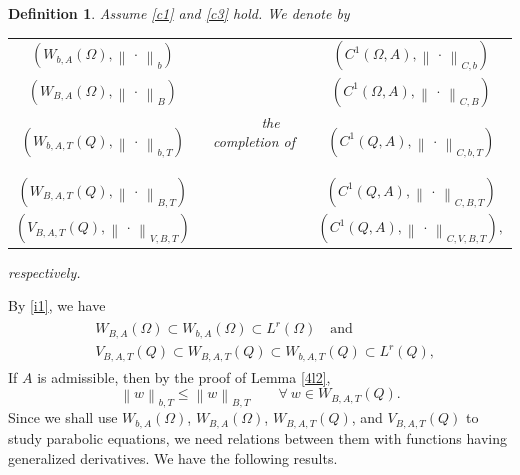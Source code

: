 \documentclass[11pt, a4paper]{article}
\newtheorem{definition}{Definition}%
\numberwithin{equation}{section}
\newcommand{\norm}[1]{\left\lVert #1\right\rVert}
\begin{document}
\begin{definition}
  Assume \eqref{c1} and \eqref{c3} hold. We denote by
  \begin{center}
    \begin{tabular}[ht]{ccc}
      $\left(W_{b,A}(\Omega),\norm{\,\cdot\,}_{b} \right)$ &  &
                                                              $\left(C^{1}(\Omega,A),\norm{\,\cdot\,}_{C,b} \right)$\\
      $\left(W_{B,A}(\Omega),\norm{\,\cdot\,}_{B} \right)$ &&
                                                              $\left(C^{1}(\Omega,A),\norm{\,\cdot\,}_{C,B} \right)$\\
      $\left(W_{b,A,T}(Q),\norm{\,\cdot\,}_{b,T} \right)$ & $\qquad$ the
                                                             completion
      of $\qquad$ &
                                                             $\left(C^{1}(Q,A),\norm{\,\cdot\,}_{C,b,T} \right)$\\
      $\left(W_{B,A,T}(Q),\norm{\,\cdot\,}_{B,T} \right)$ &&
                                                             $\left(C^{1}(Q,A),\norm{\,\cdot\,}_{C,B,T} \right)$\\
      $\left(V_{B,A,T}(Q),\norm{\,\cdot\,}_{V,B,T} \right)$ && $\left(C^{1}(Q,A),\norm{\,\cdot\,}_{C,V,B,T} \right),$
    \end{tabular}
  \end{center}
  respectively.
   \label{d44}
 \end{definition}
By \eqref{i1}, we have
    \begin{align}
      \begin{split}
        &W_{B,A}(\Omega) \subset W_{b,A}(\Omega)\subset L^{r}(\Omega)\quad \text{
   and }\\
   &V_{B,A,T}(Q) \subset W_{B,A,T}(Q) \subset W_{b,A,T}(Q) \subset L^{r}(Q), 
      \end{split}
  \label{i2}
    \end{align}
If $A$ is admissible, then by the proof of Lemma \ref{4l2}, 
\begin{equation}
  \norm{w}_{b,T}\le \norm{w}_{B,T}\qquad\forall~w\in W_{B,A,T}(Q).
  \label{i2b}
\end{equation}
 Since we shall use $W_{b,A}(\Omega)$, $W_{B,A}(\Omega)$, $W_{B,A,T}(Q)$, and $V_{B,A,T}(Q)$  to study parabolic equations, we need relations between them with functions having generalized derivatives. We have the following results.
\end{document}
